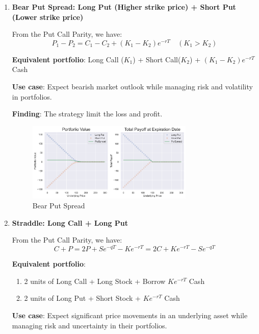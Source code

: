 \documentclass[11pt,en]{elegantpaper}
\begin{document}
\begin{enumerate}
    \item \textbf{Bear Put Spread: Long Put (Higher strike price) + Short Put (Lower strike price)}
    
    From the Put Call Parity, we have:
    \begin{equation}
        P_1 - P_2 =  C_1 - C_2+ (K_1-K_2)e^{-rT}\quad (K_1 > K_2)
    \end{equation}

    \textbf{Equivalent portfolio}: Long Call ($K_1$) + Short Call($K_2$) + $(K_1-K_2)e^{-rT}$ Cash
    
    \textbf{Use case}: Expect bearish market outlook while managing risk and volatility in portfolios.

    \textbf{Finding}: The strategy limit the loss and profit.
    \begin{figure}[htbp] 
        \centering 
        \includegraphics[width=0.75\textwidth]{./image/image_3/optionStrategy/PutSpread.png} 
        \caption{Bear Put Spread}
    \end{figure}

    \item \textbf{Straddle: Long Call + Long Put}
    
    From the Put Call Parity, we have:
    \begin{equation}
        C + P = 2P + Se^{-qT} - Ke^{-rT} = 2C + Ke^{-rT} - Se^{-qT}
    \end{equation}

    \textbf{Equivalent portfolio}: 
    \begin{enumerate}
        \item 2 units of Long Call + Long Stock + Borrow $Ke^{-rT}$ Cash
        \item 2 units of Long Put + Short Stock +  $Ke^{-rT}$ Cash
    \end{enumerate}
    
    \textbf{Use case}: Expect significant price movements in an underlying asset while managing risk and uncertainty in their portfolios.


\end{enumerate}
\end{document}
